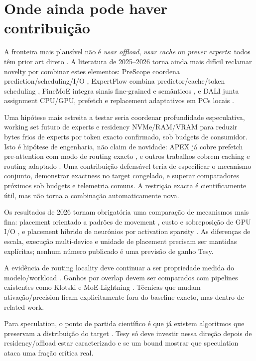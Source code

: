 \section{Onde ainda pode haver contribuição}

A fronteira mais plausível não é \emph{usar offload}, \emph{usar cache} ou \emph{prever experts}: todos têm prior art direto \cite{eliseev2023offloading,xue2024moeinfinity,song2024promoe,kong2026specprefetch}. A literatura de 2025--2026 torna ainda mais difícil reclamar novelty por combinar estes elementos: PreScope coordena prediction/scheduling/I/O \cite{yu2025prescope}, ExpertFlow combina predictor/cache/token scheduling \cite{he2026expertflow}, FineMoE integra sinais fine-grained e semânticos \cite{yu2026finemoe}, e DALI junta assignment CPU/GPU, prefetch e replacement adaptativos em PCs locais \cite{zhu2026dali}.

Uma hipótese mais estreita a testar seria coordenar profundidade especulativa, working set futuro de experts e residency NVMe/RAM/VRAM para reduzir bytes frios de experts por token exacto confirmado, sob budgets de consumidor. Isto é hipótese de engenharia, não claim de novidade: APEX já cobre prefetch pre-attention com modo de routing exacto \cite{kanani2026apex}, e outros trabalhos cobrem caching e routing adaptado \cite{wu2026cacheaware,kong2026specprefetch,xue2024moeinfinity}. Uma contribuição defensável teria de especificar o mecanismo conjunto, demonstrar exactness no target congelado, e superar comparadores próximos sob budgets e telemetria comuns. A restrição exacta é cientificamente útil, mas não torna a combinação automaticamente nova.

Os resultados de 2026 tornam obrigatória uma comparação de mecanismos mais fina: placement orientado a padrões de movement \cite{yu2026patterns}, custo e sobreposição de GPU I/O \cite{chen2026copilotio}, e placement híbrido de neurónios por activation sparsity \cite{jiang2026kairox}. As diferenças de escala, execução multi-device e unidade de placement precisam ser mantidas explícitas; nenhum número publicado é uma previsão de ganho Tesy.

A evidência de routing locality deve continuar a ser propriedade medida do modelo/workload \cite{liang2026routing}. Ganhos por overlap devem ser comparados com pipelines existentes como Klotski e MoE-Lightning \cite{fang2025klotski,cao2025moelightning}. Técnicas que mudam ativação/precision ficam explicitamente fora do baseline exacto, mas dentro de related work.

Para speculation, o ponto de partida científico é que já existem algoritmos que preservam a distribuição do target \cite{leviathan2023speculative}. Tesy só deve investir nessa direção depois de residency/offload estar caracterizado e se um bound mostrar que speculation ataca uma fração crítica real.
